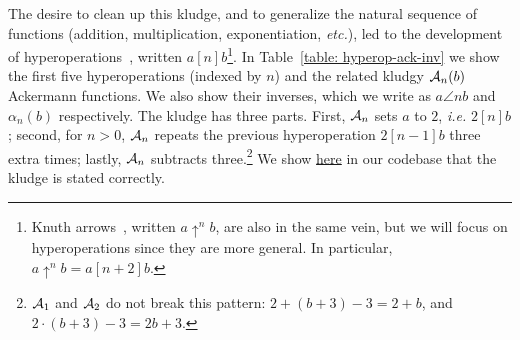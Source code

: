 The desire to clean up this kludge, and to generalize the natural sequence
of functions (addition, multiplication, exponentiation, \emph{etc.}),
led to the development of hyperoperations~\cite{goodstein},
written $a [n] b$\footnote{Knuth arrows~\cite{knuth}, written $a \uparrow^n b$,
are also in the same vein, but we will focus on hyperoperations
since they are more general. In particular, $a \uparrow^n b = a[n+2]b$.}.
In Table~\ref{table: hyperop-ack-inv} we show the first five hyperoperations
(indexed by $n$) and the related kludgy $\mathcal{A}_{n}(b)$ Ackermann functions.
We also show their inverses,
which we write as $a \angle{n} b$ and $\alpha_n(b)$ respectively.
The kludge has three parts. First, $\mathcal{A}_{n}$ sets $a$ to $2$, \emph{i.e.} $2[n]b$;
second, for $n>0$, $\mathcal{A}_n$ repeats the previous hyperoperation $2[n-1]b$
three extra times;
lastly, $\mathcal{A}_n$ subtracts three.\footnote{$\mathcal{A}_{1}$ and $\mathcal{A}_{2}$ do not break this pattern: $2 + (b + 3) - 3 = 2 + b$, and $2 \cdot (b + 3) - 3 = 2b + 3$.} We show \href{https://github.com/inv-ack/inv-ack/blob/7270e64a2600b771f2b1b1b151f7d13fb2ae6c97/repeater.v#L161-L177}{\color{blue}here} in our codebase that the kludge is stated correctly.

